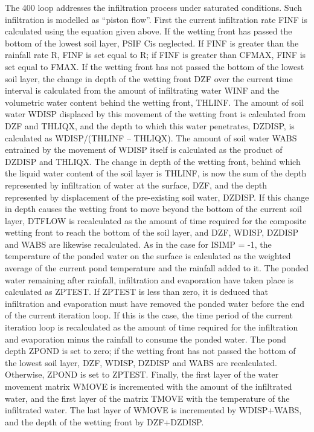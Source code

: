 The 400 loop addresses the infiltration process under saturated conditions. Such infiltration is modelled as “piston flow”. First the current infiltration rate F\+I\+N\+F is calculated using the equation given above. If the wetting front has passed the bottom of the lowest soil layer, P\+S\+I\+F Cis neglected. If F\+I\+N\+F is greater than the rainfall rate R, F\+I\+N\+F is set equal to R; if F\+I\+N\+F is greater than C\+F\+M\+A\+X, F\+I\+N\+F is set equal to F\+M\+A\+X. If the wetting front has not passed the bottom of the lowest soil layer, the change in depth of the wetting front D\+Z\+F over the current time interval is calculated from the amount of infiltrating water W\+I\+N\+F and the volumetric water content behind the wetting front, T\+H\+L\+I\+N\+F. The amount of soil water W\+D\+I\+S\+P displaced by this movement of the wetting front is calculated from D\+Z\+F and T\+H\+L\+I\+Q\+X, and the depth to which this water penetrates, D\+Z\+D\+I\+S\+P, is calculated as W\+D\+I\+S\+P/(T\+H\+L\+I\+N\+F – T\+H\+L\+I\+Q\+X). The amount of soil water W\+A\+B\+S entrained by the movement of W\+D\+I\+S\+P itself is calculated as the product of D\+Z\+D\+I\+S\+P and T\+H\+L\+I\+Q\+X. The change in depth of the wetting front, behind which the liquid water content of the soil layer is T\+H\+L\+I\+N\+F, is now the sum of the depth represented by infiltration of water at the surface, D\+Z\+F, and the depth represented by displacement of the pre-\/existing soil water, D\+Z\+D\+I\+S\+P. If this change in depth causes the wetting front to move beyond the bottom of the current soil layer, D\+T\+F\+L\+O\+W is recalculated as the amount of time required for the composite wetting front to reach the bottom of the soil layer, and D\+Z\+F, W\+D\+I\+S\+P, D\+Z\+D\+I\+S\+P and W\+A\+B\+S are likewise recalculated. As in the case for I\+S\+I\+M\+P = -\/1, the temperature of the ponded water on the surface is calculated as the weighted average of the current pond temperature and the rainfall added to it. The ponded water remaining after rainfall, infiltration and evaporation have taken place is calculated as Z\+P\+T\+E\+S\+T. If Z\+P\+T\+E\+S\+T is less than zero, it is deduced that infiltration and evaporation must have removed the ponded water before the end of the current iteration loop. If this is the case, the time period of the current iteration loop is recalculated as the amount of time required for the infiltration and evaporation minus the rainfall to consume the ponded water. The pond depth Z\+P\+O\+N\+D is set to zero; if the wetting front has not passed the bottom of the lowest soil layer, D\+Z\+F, W\+D\+I\+S\+P, D\+Z\+D\+I\+S\+P and W\+A\+B\+S are recalculated. Otherwise, Z\+P\+O\+N\+D is set to Z\+P\+T\+E\+S\+T. Finally, the first layer of the water movement matrix W\+M\+O\+V\+E is incremented with the amount of the infiltrated water, and the first layer of the matrix T\+M\+O\+V\+E with the temperature of the infiltrated water. The last layer of W\+M\+O\+V\+E is incremented by W\+D\+I\+S\+P+\+W\+A\+B\+S, and the depth of the wetting front by D\+Z\+F+\+D\+Z\+D\+I\+S\+P.

